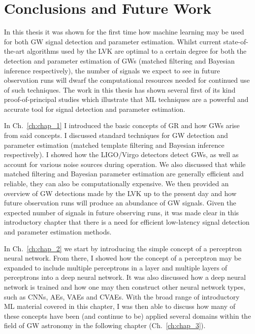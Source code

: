 \chapter{Conclusions and Future Work}\label{ch:chap_6}

In this thesis it was shown for the first time how machine learning may 
be used for both \ac{GW} signal detection and parameter estimation. 
Whilst current state-of-the-art algorithms used by the \ac{LVK} are 
optimal to a certain degree for both 
the detection and parameter estimation of \acp{GW} (matched filtering 
and Bayesian inference respectively), the number of signals we expect to 
see in future observation runs will dwarf the computational 
resources needed for continued use of such techniques. The 
work in this thesis has shown several first of its kind proof-of-principal 
studies which illustrate that \ac{ML} techniques are a powerful and accurate tool for signal detection and parameter estimation.

%
%

In Ch.~\ref{ch:chap_1} I introduced the basic concepts of 
\ac{GR} and how \acp{GW} arise from said concepts.  
I discussed standard techniques for \ac{GW} detection and parameter 
estimation (matched template filtering and Bayesian inference respectively). 
I showed how the \ac{LIGO}/Virgo detectors detect \acp{GW}, as well as account 
for 
various noise sources during operation. We also discussed that while matched 
filtering and Bayesian parameter estimation are generally efficient and 
reliable, they can also be computationally expensive. We then provided an 
overview of \ac{GW} detections made by the \ac{LVK} up to the present day and 
how future observation runs will produce an abundance of \ac{GW} signals. 
Given the expected number of signals in future observing runs, 
it was made clear in this 
introductory chapter that there is a need for efficient low-latency signal 
detection and parameter estimation methods.  

In Ch.~\ref{ch:chap_2} we start by introducing the simple concept of 
a perceptron neural network. From there, I showed how the concept of a 
perceptron may be expanded to include multiple perceptrons in a layer and multiple 
layers of perceptrons into a deep neural network. It was also discussed how 
a deep neural network is trained and how one may then construct other 
neural network types, such as \acp{CNN}, \acp{AE}, \acp{VAE} and \acp{CVAE}. 
With the broad range of introductory \ac{ML} material covered in this chapter, 
I was then able to discuss how many of these concepts have been (and continue 
to be) applied several domains within the field of \ac{GW} astronomy in the 
following chapter (Ch.~\ref{ch:chap_3}).

